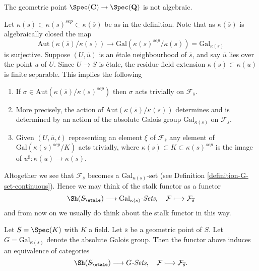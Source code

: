 \begin{example}
\label{example-stupid}
The geometric point
$\Spec(\mathbf{C}) \to \Spec(\mathbf{Q})$
is not algebraic.
\end{example}

\noindent
Let $\kappa(s) \subset \kappa(s)^{sep} \subset \kappa(\overline{s})$
be as in the definition. Note that as $\kappa(\overline{s})$ is algebraically
closed the map
$$
\text{Aut}(\kappa(\overline{s})/\kappa(s))
\longrightarrow
\text{Gal}(\kappa(s)^{sep}/\kappa(s)) = \text{Gal}_{\kappa(s)}
$$
is surjective. Suppose $(U, \overline{u})$ is an
\'etale neighbourhood of $\overline{s}$, and say $\overline{u}$ lies over
the point $u$ of $U$. Since $U \to S$ is \'etale, the residue field extension
$\kappa(s) \subset \kappa(u)$ is finite separable.
This implies the following
\begin{enumerate}
\item If $\sigma \in \text{Aut}(\kappa(\overline{s})/\kappa(s)^{sep})$
then $\sigma$ acts trivially on $\mathcal{F}_{\overline{s}}$.
\item More precisely, the action of
$\text{Aut}(\kappa(\overline{s})/\kappa(s))$
determines and is determined by an action of the absolute Galois group
$\text{Gal}_{\kappa(s)}$ on $\mathcal{F}_{\overline{s}}$.
\item Given $(U, \overline{u}, t)$ representing an element $\xi$ of
$\mathcal{F}_{\overline{s}}$ any element of
$\text{Gal}(\kappa(s)^{sep}/K)$ acts trivially, where
$\kappa(s) \subset K \subset \kappa(s)^{sep}$ is the image of
$\overline{u}^\sharp : \kappa(u) \to \kappa(\overline{s})$.
\end{enumerate}
Altogether we see that $\mathcal{F}_{\overline{s}}$ becomes a
$\text{Gal}_{\kappa(s)}$-set (see
Definition \ref{definition-G-set-continuous}).
Hence we may think of the stalk functor as a functor
$$
\Sh(S_\etale) \longrightarrow
\text{Gal}_{\kappa(s)}\textit{-Sets},
\quad
\mathcal{F} \longmapsto \mathcal{F}_{\overline{s}}
$$
and from now on we usually do think about the stalk functor in this way.

\begin{theorem}
\label{theorem-equivalence-sheaves-point}
Let $S = \Spec(K)$ with $K$ a field.
Let $\overline{s}$ be a geometric point of $S$.
Let $G = \text{Gal}_{\kappa(s)}$ denote the absolute Galois group.
Then the functor above induces an equivalence of categories
$$
\Sh(S_\etale) \longrightarrow G\textit{-Sets},
\quad
\mathcal{F} \longmapsto \mathcal{F}_{\overline{s}}.
$$
\end{theorem}

